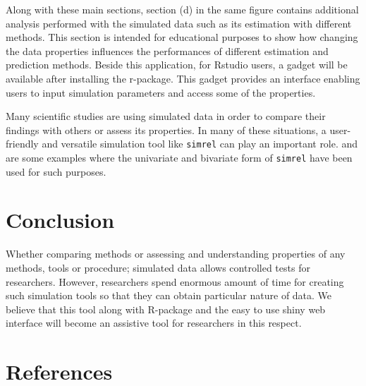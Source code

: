 \documentclass[review]{elsarticle}
\theoremstyle{definition}
\theoremstyle{definition}
\theoremstyle{definition}
\theoremstyle{remark}
\begin{document}
Along with these main sections, section (d) in the same figure contains
additional analysis performed with the simulated data such as its
estimation with different methods. This section is intended for
educational purposes to show how changing the data properties influences
the performances of different estimation and prediction methods. Beside
this application, for Rstudio users, a gadget will be available after
installing the r-package. This gadget provides an interface enabling
users to input simulation parameters and access some of the properties.

Many scientific studies
\citep{helland2012near, saebo2008lpls, cook2015simultaneous} are using
simulated data in order to compare their findings with others or assess
its properties. In many of these situations, a user-friendly and
versatile simulation tool like \texttt{simrel} can play an important
role. \citet{gangsei2016theoretical} and \citet{saebo2015simrel} are
some examples where the univariate and bivariate form of \texttt{simrel}
have been used for such purposes.

\section{Conclusion}\label{conclusion}

Whether comparing methods or assessing and understanding properties of
any methods, tools or procedure; simulated data allows controlled tests
for researchers. However, researchers spend enormous amount of time for
creating such simulation tools so that they can obtain particular nature
of data. We believe that this tool along with R-package and the easy to
use shiny web interface will become an assistive tool for researchers in
this respect.

\section{References}\label{references}


\renewcommand\refname{References}

\end{document}
